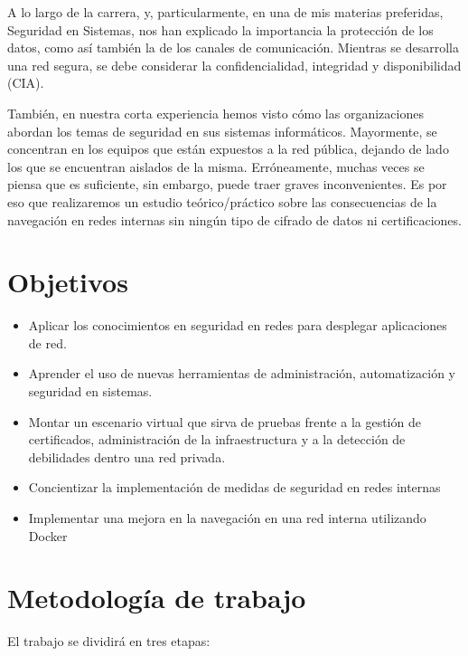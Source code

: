 %


A lo largo de la carrera, y, particularmente, en una de mis materias preferidas, 
Seguridad en Sistemas, nos han explicado la importancia la protección de los 
datos, como así también la de los canales de comunicación. Mientras se desarrolla 
una red segura, se debe considerar la confidencialidad, integridad y disponibilidad 
(CIA). 

También, en nuestra corta experiencia hemos visto cómo las organizaciones 
abordan los temas de seguridad en sus sistemas informáticos. Mayormente, se 
concentran en los equipos que están expuestos a la red pública, dejando de 
lado los que se encuentran aislados de la misma. Erróneamente, muchas veces 
se piensa que es suficiente, sin embargo, puede traer graves inconvenientes. 
Es por eso que realizaremos un estudio teórico/práctico sobre las consecuencias 
de la navegación en redes internas sin ningún tipo de cifrado de datos ni 
certificaciones.

\section{Objetivos}

\begin{itemize}
    \setlength\itemsep{-0.6em}
    \item Aplicar los conocimientos en seguridad en redes para desplegar aplicaciones de red.
    \item Aprender el uso de nuevas herramientas de administración, automatización y seguridad en sistemas.
    \item Montar un escenario virtual que sirva de pruebas frente a la gestión de certificados, administración de la infraestructura y a la detección de debilidades dentro una red privada.
    \item Concientizar la implementación de medidas de seguridad en redes internas
    \item Implementar una mejora en la navegación en una red interna utilizando Docker
\end{itemize}


\section{Metodología de trabajo}
El trabajo se dividirá en tres etapas:

